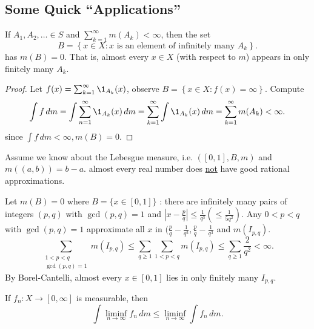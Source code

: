 \subsection{Some Quick ``Applications''}

\begin{theorem}
	If $A_1, A_2, \ldots \in S$ and $\sum_{k = 1}^{\infty} m(A_k) < \infty$, then the set
	\[
		B = \left\{x \in X : x \textrm{ is an element of infinitely many } A_k \right\}.
	\]
	has $m(B) = 0$.
	That is, almost every $x \in X$ (with respect to $m$) appears in only finitely many $A_k$.
\end{theorem}

\begin{proof}
	Let $f(x) = \sum_{k = 1}^{\infty} \1_{A_k}(x)$, observe $B = \left\{x \in X : f(x) = \infty \right\}$.
	Compute
	\[
		\int f \, dm = \int \sum_{n = 1}^{\infty} \1_{A_k}(x) \, dm = \sum_{k = 1}^{\infty} \int \1_{A_k}(x) \, dm = \sum_{k = 1}^{\infty} m(A_k) < \infty.
	\]
	since $\int f \, dm < \infty, m(B) = 0$.
\end{proof}

\begin{example}[\& Application]
Assume we know about the Lebesgue measure, i.e. $([0,1], B, m)$ and $m((a,b)) = b - a$.
almost every real number does \underline{not} have good rational approximations.
\end{example}

\begin{theorem}
	Let $m(B) = 0$ where $B = \{ x \in [0,1] \}$ : there are infinitely many pairs of integers $(p,q)$ with $\gcd (p, q) = 1$ and $\left| x - \frac{p}{q} \right| \leq \frac{1}{q^3} \left( \leq \frac{1}{5q^2} \right)$.
	Any $0 < p < q$ with $\gcd(p,q) = 1$ approximate all $x$ in $(\frac{p}{q} - \frac{1}{q^3}, \frac{p}{q} - \frac{1}{q^3}$ and $m(I_{p,q})$.
	\[
		\sum_{\substack{1 < p < q \\ \gcd (p, q) = 1}} m(I_{p,q}) \leq \sum_{q \geq 1} \sum_{1 < p < q} m(I_{p, q}) \leq \sum_{q \geq 1}^{} \frac{2}{q^2} < \infty.
	\]
	By Borel-Cantelli, almost every $x \in [0,1]$ lies in only finitely many $I_{p,q}$.
\end{theorem}

\begin{lemma}
	If $f_n : X \to [0, \infty]$ is measurable, then
	\[
		\int \liminf_{n \to \infty} f_n \, dm \leq \liminf_{n \to \infty} \int f_n \, dm.
	\]
\end{lemma}

